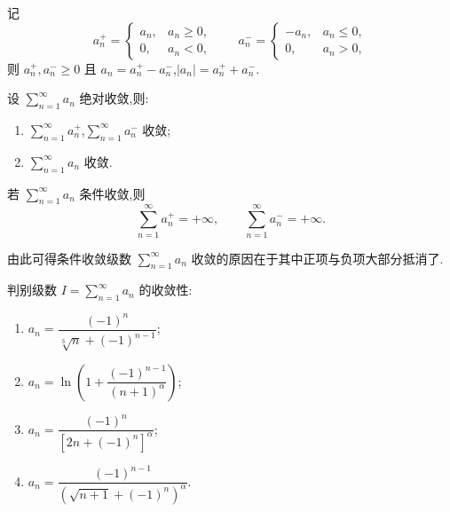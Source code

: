 记
\[
    a_n^+=\begin{cases}a_n, & a_n\geq0, \\0,&a_n<0,
    \end{cases}
    \qquad
    a_n^-=\begin{cases}-a_n, & a_n\leq0, \\0,&a_n>0,
    \end{cases}
\]
则 $a_n^+,a_n^-\geq0$ 且 $a_n=a_n^+-a_n^-$,$|a_n|=a_n^++a_n^-$.

\begin{theorem}[\markstar]
    设 $\displaystyle\sum\limits_{n=1}^{\infty}a_n$ 绝对收敛,则:
    \begin{enumerate}
        \item $\displaystyle\sum\limits_{n=1}^{\infty}a_n^+$,$\displaystyle\sum\limits_{n=1}^{\infty}a_n^-$ 收敛;
        \item $\displaystyle\sum\limits_{n=1}^{\infty}a_n$ 收敛.
    \end{enumerate}
\end{theorem}

\begin{corollary}[\markstar]
    若 $\displaystyle\sum\limits_{n=1}^{\infty}a_n$ 条件收敛,则
    \[
        \displaystyle\sum\limits_{n=1}^{\infty}a_n^+=+\infty,
        \qquad
        \sum\limits_{n=1}^{\infty}a_n^-=+\infty.
    \]
\end{corollary}

\begin{remark}
    由此可得条件收敛级数 $\displaystyle\sum\limits_{n=1}^{\infty}a_n$ 收敛的原因在于其中正项与负项大部分抵消了.
\end{remark}

\begin{example}
    判别级数 $\displaystyle I=\sum\limits_{n=1}^{\infty}a_n$ 的收敛性:
    \begin{enumerate}
        \item $\displaystyle a_n=\dfrac{(-1)^n}{\sqrt[3]{n}+(-1)^{n-1}}$;
        \item $\displaystyle a_n=\ln\left(1+\dfrac{(-1)^{n-1}}{(n+1)^\alpha}\right)$;
        \item $\displaystyle a_n=\dfrac{(-1)^n}{[2n+(-1)^n]^\alpha}$;
        \item $\displaystyle a_n=\dfrac{(-1)^{n-1}}{(\sqrt{n+1}+(-1)^n)^\alpha}$.
    \end{enumerate}
\end{example}
\exampleblank

